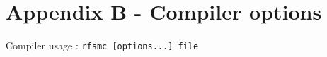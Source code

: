 \chapter*{Appendix B - Compiler options}
\label{cha:compiler-options}

Compiler usage : \verb|rfsmc [options...] file|

\medskip
\begin{tabular}[c]{ll}

\end{tabular}

\normalsize

